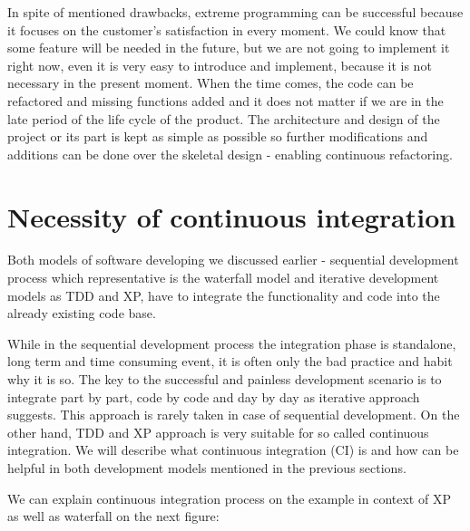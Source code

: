 \documentclass[12pt,final,oneside]{fithesis}
\begin{document}
In spite of mentioned drawbacks, extreme programming can be successful because it focuses on the customer's satisfaction in every moment. We could know that some feature will be needed in the future, but we are not going to implement it right now, even it is very easy to introduce and implement, because it is not necessary in the present moment. When the time comes, the code can be refactored and missing functions added and it does not matter if we are in the late period of the life cycle of the product. The architecture and design of the project or its part is kept as simple as possible so further modifications and additions can be done over the skeletal design - enabling continuous refactoring.

	\section{Necessity of continuous integration}
	
Both models of software developing we discussed earlier - sequential development process which representative is the waterfall model and iterative development models as TDD and XP, have to integrate the functionality and code into the already existing code base.

While in the sequential development process the integration phase is standalone, long term and time consuming event, it is often only the bad practice and habit why it is so. The key to the successful and painless development scenario is to integrate part by part, code by code and day by day as iterative approach suggests. This approach is rarely taken in case of sequential development. On the other hand, TDD and XP approach is very suitable for so called continuous integration. We will describe what continuous integration (CI) is and how can be helpful in both development models mentioned in the previous sections.

We can explain continuous integration process on the example in context of XP as well as waterfall on the next figure:
\end{document}
